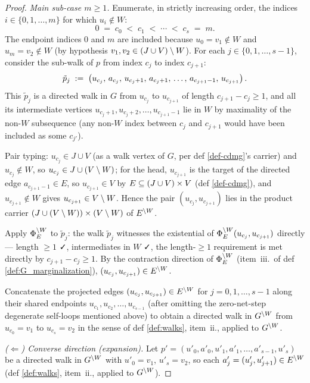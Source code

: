 \documentclass[main]{subfiles}
\begin{document}
\begin{proof}
\emph{Main sub-case $m \ge 1$.}
Enumerate, in strictly increasing order, the indices $i \in \{0, 1, \dots, m\}$ for which $u_i \notin W$:
\[
    0 \;=\; c_0 \;<\; c_1 \;<\; \cdots \;<\; c_s \;=\; m.
\]
The endpoint indices $0$ and $m$ are included because $u_0 = v_1 \notin W$ and $u_m = v_2 \notin W$ (by hypothesis $v_1, v_2 \in (J \cup V) \setminus W$). For each $j \in \{0, 1, \dots, s-1\}$, consider the sub-walk of $p$ from index $c_j$ to index $c_{j+1}$:
\[
    \tilde{p}_j \;:=\; \left ( u_{c_j},\, a_{c_j},\, u_{c_j + 1},\, a_{c_j + 1},\, \dots,\, a_{c_{j+1} - 1},\, u_{c_{j+1}} \right ).
\]
This $\tilde{p}_j$ is a directed walk in $G$ from $u_{c_j}$ to $u_{c_{j+1}}$ of length $c_{j+1} - c_j \ge 1$, and all its intermediate vertices $u_{c_j + 1}, u_{c_j + 2}, \dots, u_{c_{j+1} - 1}$ lie in $W$ by maximality of the non-$W$ subsequence (any non-$W$ index between $c_j$ and $c_{j+1}$ would have been included as some $c_{j'}$).

Pair typing: $u_{c_j} \in J \cup V$ (as a walk vertex of $G$, per def \ref{def-cdmg}'s carrier) and $u_{c_j} \notin W$, so $u_{c_j} \in J \cup (V \setminus W)$; for the head, $u_{c_{j+1}}$ is the target of the directed edge $a_{c_{j+1} - 1} \in E$, so $u_{c_{j+1}} \in V$ by $E \subseteq (J \cup V) \times V$ (def \ref{def-cdmg}), and $u_{c_{j+1}} \notin W$ gives $u_{c_{j+1}} \in V \setminus W$. Hence the pair $(u_{c_j}, u_{c_{j+1}})$ lies in the product carrier $(J \cup (V \setminus W)) \times (V \setminus W)$ of $E^{\setminus W}$.

Apply $\Phi_E^{\setminus W}$ to $\tilde{p}_j$: the walk $\tilde{p}_j$ witnesses the existential of $\Phi_E^{\setminus W}(u_{c_j}, u_{c_{j+1}})$ directly --- length $\ge 1$ ✓, intermediates in $W$ ✓, the length-$\ge 1$ requirement is met directly by $c_{j+1} - c_j \ge 1$. By the contraction direction of $\Phi_E^{\setminus W}$ (item~iii.\ of def \ref{def:G_marginalization}), $(u_{c_j}, u_{c_{j+1}}) \in E^{\setminus W}$.

Concatenate the projected edges $(u_{c_j}, u_{c_{j+1}}) \in E^{\setminus W}$ for $j = 0, 1, \dots, s-1$ along their shared endpoints $u_{c_1}, u_{c_2}, \dots, u_{c_{s-1}}$ (after omitting the zero-net-step degenerate self-loops mentioned above) to obtain a directed walk in $G^{\setminus W}$ from $u_{c_0} = v_1$ to $u_{c_s} = v_2$ in the sense of def \ref{def:walks}, item~ii., applied to $G^{\setminus W}$.

\smallskip\noindent\emph{($\Leftarrow$) Converse direction (expansion).}
Let $p' = (u'_0, a'_0, u'_1, a'_1, \dots, a'_{s-1}, u'_s)$ be a directed walk in $G^{\setminus W}$ with $u'_0 = v_1$, $u'_s = v_2$, so each $a'_j = (u'_j, u'_{j+1}) \in E^{\setminus W}$ (def \ref{def:walks}, item~ii., applied to $G^{\setminus W}$).


\end{proof}
\end{document}
